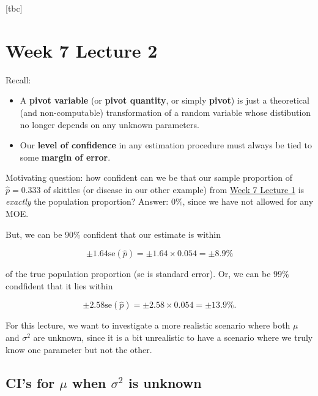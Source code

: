 [tbc]




\section{Week 7 Lecture 2}\label{sec:w7lec2}

Recall:

\begin{itemize}
    \item A \textbf{pivot variable} (or \textbf{pivot quantity}, or simply \textbf{pivot}) is just a theoretical (and non-computable) transformation of a random variable whose distibution no longer depends on any unknown parameters.
    \item Our \textbf{level of confidence} in any estimation procedure must always be tied to some \textbf{margin of error}. 
\end{itemize}

Motivating question: how confident can we be that our sample proportion of \(\hat{p} = 0.333\) of skittles (or disease in our other example) from \hyperref[sec:w7lec1]{Week 7 Lecture 1} is \textit{exactly} the population proportion?
Answer: \(0\%\), since we have not allowed for any MOE. 

\bigskip

But, we can be \(90\%\) confident that our estimate is within

\begin{equation*}
    \pm1.64 \text{se}(\hat{p}) = \pm 1.64 \times 0.054 = \pm 8.9\%
\end{equation*}

of the true population proportion (se is standard error). 
Or, we can be \(99\%\) condfident that it lies within 

\begin{equation*}
    \pm2.58 \text{se}(\hat{p}) = \pm 2.58  \times 0.054 = \pm 13.9\%.
\end{equation*}

For this lecture, we want to investigate a more realistic scenario where both \(\mu\) and \(\sigma^2\) are unknown, since it is a bit unrealistic to have a scenario where we truly know one parameter but not the other. 

\subsection{CI's for \texorpdfstring{\(\mu\)}{mu} when \texorpdfstring{\(\sigma^2\)}{sigma\^2} is unknown} \label{subsec:CI for mu, sigma unknown}

